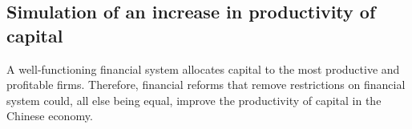 \documentclass[AER]{AEA}
\begin{document}
\subsection{Simulation of an increase in productivity of capital}
\label{sec:sim3}

A well-functioning financial system allocates capital to the most productive 
and profitable firms.
Therefore, financial reforms that remove restrictions on financial system could,  
all else being equal, improve the productivity of capital in the Chinese economy. 



\end{document}
